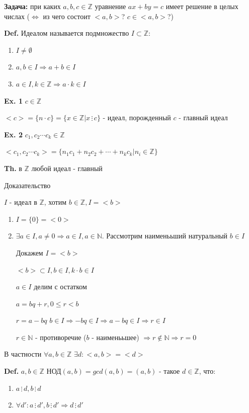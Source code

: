 \documentclass[14pt, letter paper]{article}
\begin{document}
\textbf{Задача:} при каких $a, b, c \in \mathbb{Z}$ уравнение $ax + by = c$ имеет решение в целых числах ($\Leftrightarrow$ из чего состоит $<a, b>$? $c \in <a, b>$?)

\textbf{Def.} Идеалом называется подмножество $I \subset \mathbb{Z}$:
\begin{enumerate}
    \item $I \neq \emptyset$
    \item $a, b \in I \Rightarrow a + b \in I$
    \item $a \in I, k \in \mathbb{Z} \Rightarrow a \cdot k \in I$
\end{enumerate}

\textbf{Ex. 1} $c \in \mathbb{Z}$

$<c> = \{n \cdot c\} = \{ x \in \mathbb{Z} | x \, \vdots \, c\}$ - идеал, порожденный $c$ - главный идеал

\textbf{Ex. 2} $c_1, c_2 \cdots c_k \in \mathbb{Z}$

$<c_1, c_2 \cdots c_k> = \{n_1 c_1 + n_2 c_2 + \cdots + n_k c_k | n_i \in \mathbb{Z} \}$

{\textbf{Th.} в $\mathbb{Z}$ любой идеал - главный}

\begin{center}
    Доказательство
\end{center}

$I$ - идеал в $\mathbb{Z}$, хотим $b \in \mathbb{Z}, I = <b>$

\begin{enumerate}
    \item $I = \{0\} = <0>$
    \item $\exists a \in I, a \neq 0 \Rightarrow a \in I, a \in \mathbb{N}$. Рассмотрим наименььший натуральный $b \in I$

    Докажем $I = <b>$

    $<b> \subset I, b \in I, k \cdot b \in I$

    $a \in I$ делим с остатком

    $a = bq + r, 0 \leq r < b$

    $r = a - bq$ $b \in I \Rightarrow -bq \in I \Rightarrow a - bq \in I \Rightarrow r \in I$

    $r \in \mathbb{N}$ - противоречие ($b$ - наименььшее) $\Rightarrow r \notin \mathbb{N} \Rightarrow r = 0$
\end{enumerate}

В частности $\forall a, b \in \mathbb{Z}$ $\exists d: <a, b> = <d>$

\textbf{Def.} $a, b \in \mathbb{Z}$ НОД$(a, b) = gcd(a, b) = (a, b)$ - такое $d \in \mathbb{Z}$, что:
\begin{enumerate}
    \item $a \, \vdots \, d, b \, \vdots \, d$
    \item $\forall d': a \, \vdots \, d', b \, \vdots \, d' \Rightarrow d \, \vdots \, d'$
\end{enumerate}
\end{document}
